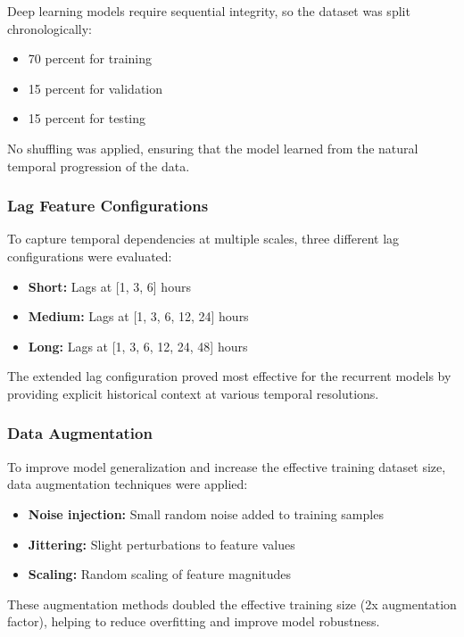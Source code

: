 \documentclass[oneside, 12pt]{book}
\numberwithin{equation}{chapter}
\begin{document}
Deep learning models require sequential integrity, so the dataset was split chronologically:
\begin{itemize}
    \item 70 percent for training
    \item 15 percent for validation
    \item 15 percent for testing
\end{itemize}

No shuffling was applied, ensuring that the model learned from the natural temporal progression of the data.

\subsubsection{Lag Feature Configurations}

To capture temporal dependencies at multiple scales, three different lag configurations were evaluated:
\begin{itemize}
    \item \textbf{Short:} Lags at [1, 3, 6] hours
    \item \textbf{Medium:} Lags at [1, 3, 6, 12, 24] hours
    \item \textbf{Long:} Lags at [1, 3, 6, 12, 24, 48] hours
\end{itemize}

The extended lag configuration proved most effective for the recurrent models by providing explicit historical context at various temporal resolutions.

\subsubsection{Data Augmentation}

To improve model generalization and increase the effective training dataset size, data augmentation techniques were applied:
\begin{itemize}
    \item \textbf{Noise injection:} Small random noise added to training samples
    \item \textbf{Jittering:} Slight perturbations to feature values
    \item \textbf{Scaling:} Random scaling of feature magnitudes
\end{itemize}

These augmentation methods doubled the effective training size (2x augmentation factor), helping to reduce overfitting and improve model robustness.
\end{document}
